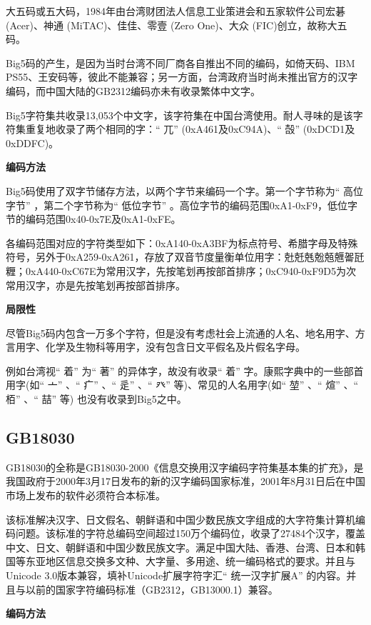 \documentclass[doctor,openright,twoside]{sjtuthesis}
\theoremstyle{plain}
\theoremstyle{definition}
\theoremstyle{remark}
\theoremstyle{ocrenumbox}
\theoremstyle{plain}
\begin{document}
大五码或五大码，1984年由台湾财团法人信息工业策进会和五家软件公司宏碁 (Acer)、神通 (MiTAC)、佳佳、零壹 (Zero One)、大众 (FIC)创立，故称大五码。

Big5码的产生，是因为当时台湾不同厂商各自推出不同的编码，如倚天码、IBM PS55、王安码等，彼此不能兼容；另一方面，台湾政府当时尚未推出官方的汉字编码，而中国大陆的GB2312编码亦未有收录繁体中文字。

Big5字符集共收录13,053个中文字，该字符集在中国台湾使用。耐人寻味的是该字符集重复地收录了两个相同的字：`` 兀'' (0xA461及0xC94A)、`` 嗀'' (0xDCD1及0xDDFC)。

\textbf{编码方法}

Big5码使用了双字节储存方法，以两个字节来编码一个字。第一个字节称为`` 高位字节'' ，第二个字节称为`` 低位字节'' 。高位字节的编码范围0xA1-0xF9，低位字节的编码范围0x40-0x7E及0xA1-0xFE。

各编码范围对应的字符类型如下：0xA140-0xA3BF为标点符号、希腊字母及特殊符号，另外于0xA259-0xA261，存放了双音节度量衡单位用字：兙兛兞兝兡兣嗧瓩糎；0xA440-0xC67E为常用汉字，先按笔划再按部首排序；0xC940-0xF9D5为次常用汉字，亦是先按笔划再按部首排序。

\textbf{局限性}

尽管Big5码内包含一万多个字符，但是没有考虑社会上流通的人名、地名用字、方言用字、化学及生物科等用字，没有包含日文平假名及片假名字母。

例如台湾视`` 着'' 为`` 著'' 的异体字，故没有收录`` 着'' 字。康熙字典中的一些部首用字(如`` 亠'' 、`` 疒'' 、`` 辵'' 、`` 癶'' 等)、常见的人名用字(如`` 堃'' 、`` 煊'' 、`` 栢'' 、`` 喆'' 等) 也没有收录到Big5之中。

\hypertarget{gb18030}{%
\subsection{GB18030}\label{gb18030}}

GB18030的全称是GB18030-2000《信息交换用汉字编码字符集基本集的扩充》，是我国政府于2000年3月17日发布的新的汉字编码国家标准，2001年8月31日后在中国市场上发布的软件必须符合本标准。

该标准解决汉字、日文假名、朝鲜语和中国少数民族文字组成的大字符集计算机编码问题。该标准的字符总编码空间超过150万个编码位，收录了27484个汉字，覆盖中文、日文、朝鲜语和中国少数民族文字。满足中国大陆、香港、台湾、日本和韩国等东亚地区信息交换多文种、大字量、多用途、统一编码格式的要求。并且与Unicode 3.0版本兼容，填补Unicode扩展字符字汇`` 统一汉字扩展A'' 的内容。并且与以前的国家字符编码标准（GB2312，GB13000.1）兼容。

\textbf{编码方法}
\end{document}

